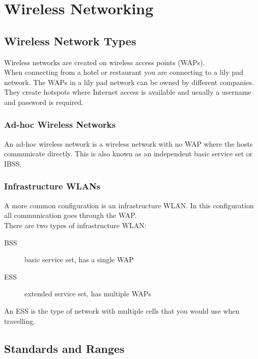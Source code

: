\section{Wireless Networking}

\subsection{Wireless Network Types}

Wireless networks are created on wireless access points (WAPs).\\

When connecting from a hotel or restaurant you are connecting to a lily pad
network. The WAPs in a lily pad network can be owned by different companies.
They create hotspots where Internet access is available and usually a username
and password is required.

\subsubsection{Ad-hoc Wireless Networks}

An ad-hoc wireless network is a wireless network with no WAP where the hosts
communicate directly. This is also known as an independent basic service set
or IBSS.

\subsubsection{Infrastructure WLANs}

A more common configuration is an infrastructure WLAN. In this configuration
all communication goes through the WAP.\\

There are two types of infrastructure WLAN:

\begin{description}

\item[BSS]
basic service set, has a single WAP

\item[ESS]
extended service set, has multiple WAPs

\end{description}

An ESS is the type of network with multiple cells that you would use when
travelling.

\subsection{Standards and Ranges}

